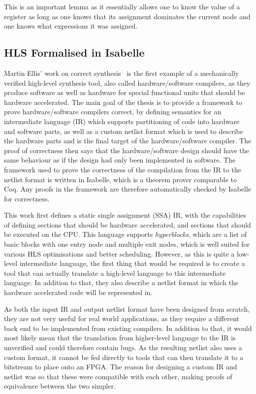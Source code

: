 This is an important lemma as it essentially allows one to know the value of a register as long as
one knows that its assignment dominates the current node and one knows what expressions it was
assigned.

\subsection{HLS Formalised in Isabelle}

Martin Ellis' work on correct synthesis~\cite{ellis08_correc} is the first example of a mechanically
verified high-level synthesis tool, also called hardware/software compilers, as they produce
software as well as hardware for special functional units that should be hardware accelerated.  The
main goal of the thesis is to provide a framework to prove hardware/software compilers correct, by
defining semantics for an intermediate language (IR) which supports partitioning of code into
hardware and software parts, as well as a custom netlist format which is used to describe the
hardware parts and is the final target of the hardware/software compiler.  The proof of correctness
then says that the hardware/software design should have the same behaviour as if the design had only
been implemented in software.  The framework used to prove the correctness of the compilation from
the IR to the netlist format is written in Isabelle, which is a theorem prover comparable to Coq.
Any proofs in the framework are therefore automatically checked by Isabelle for correctness.

This work first defines a static single assignment (SSA) IR, with the capabilities of defining
sections that should be hardware accelerated, and sections that should be executed on the CPU.  This
language supports \emph{hyperblocks}, which are a list of basic blocks with one entry node and
multiple exit nodes, which is well suited for various HLS optimisations and better scheduling.
However, as this is quite a low-level intermediate language, the first thing that would be required
is to create a tool that can actually translate a high-level language to this intermediate language.
In addition to that, they also describe a netlist format in which the hardware accelerated code will
be represented in.

As both the input IR and output netlist format have been designed from scratch, they are not very
useful for real world applications, as they require a different back end to be implemented from
existing compilers.  In addition to that, it would most likely mean that the translation from
higher-level language to the IR is unverified and could therefore contain bugs.  As the resulting
netlist also uses a custom format, it cannot be fed directly to tools that can then translate it to
a bitstream to place onto an FPGA. The reason for designing a custom IR and netlist was so that
these were compatible with each other, making proofs of equivalence between the two simpler.

